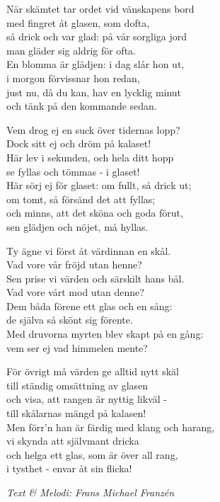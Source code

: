 \vspace{10pt}
När skämtet tar ordet vid vänskapens bord\\
med fingret åt glasen, som dofta,\\
så drick och var glad: på vår sorgliga jord\\
man gläder sig aldrig för ofta.\\
En blomma är glädjen: i dag slår hon ut,\\
i morgon förvissnar hon redan,\\
just nu, då du kan, hav en lycklig minut\\
och tänk på den kommande sedan.\par
\vspace{10pt}
Vem drog ej en suck över tidernas lopp?\\
Dock sitt ej och dröm på kalaset!\\
Här lev i sekunden, och hela ditt hopp\\
se fyllas och tömmas - i glaset!\\
Här sörj ej för glaset: om fullt, så drick ut;\\
om tomt, så försänd det att fyllas;\\
och minns, att det sköna och goda förut,\\
sen glädjen och nöjet, må hyllas.\par
\newpage
Ty ägne vi först åt värdinnan en skål.\\
Vad vore vår fröjd utan henne?\\
Sen prise vi värden och särskilt hans bål.\\
Vad vore vårt mod utan denne?\\
Dem båda förene ett glas och en sång:\\
de själva så skönt sig förente.\\
Med druvorna myrten blev skapt på en gång:\\
vem ser ej vad himmelen mente?\par
\vspace{10pt}
För övrigt må värden ge alltid nytt skäl\\
till ständig omsättning av glasen\\
och visa, att rangen är nyttig likväl -\\
till skålarnas mängd på kalasen!\\
Men förr'n han är färdig med klang och harang,\\
vi skynda att självmant dricka\\
och helga ett glas, som är över all rang,\\
i tysthet - envar åt sin flicka!\par
\vspace{10pt}
{\footnotesize\textit{Text \& Melodi: Frans Michael Franzén}}
